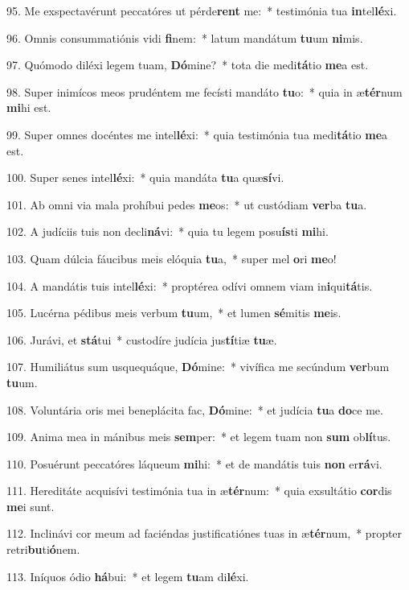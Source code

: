 95. Me exspectavérunt peccatóres ut pérde\textbf{rent} me:~*  testimónia tua \textbf{in}tel\textbf{lé}xi.\

96. Omnis consummatiónis vidi \textbf{fi}nem:~*  latum mandátum \textbf{tu}um \textbf{ni}mis.\

97. Quómodo diléxi legem tuam, \textbf{Dó}mine?~*  tota die medi\textbf{tá}tio \textbf{me}a est.\

98. Super inimícos meos prudéntem me fecísti mandáto \textbf{tu}o:~*  quia in æ\textbf{tér}num \textbf{mi}hi est.\

99. Super omnes docéntes me intel\textbf{lé}xi:~*  quia testimónia tua medi\textbf{tá}tio \textbf{me}a est.\

100. Super senes intel\textbf{lé}xi:~*  quia mandáta \textbf{tu}a quæ\textbf{sí}vi.\

101. Ab omni via mala prohíbui pedes \textbf{me}os:~*  ut custódiam \textbf{ver}ba \textbf{tu}a.\

102. A judíciis tuis non decli\textbf{ná}vi:~*  quia tu legem posu\textbf{ís}ti \textbf{mi}hi.\

103. Quam dúlcia fáucibus meis elóquia \textbf{tu}a,~*  super mel \textbf{o}ri \textbf{me}o!\

104. A mandátis tuis intel\textbf{lé}xi:~*  proptérea odívi omnem viam in\textbf{i}qui\textbf{tá}tis.\

105. Lucérna pédibus meis verbum \textbf{tu}um,~*  et lumen \textbf{sé}mitis \textbf{me}is.\

106. Jurávi, et \textbf{stá}tui~*  custodíre judícia jus\textbf{tí}tiæ \textbf{tu}æ.\

107. Humiliátus sum usquequáque, \textbf{Dó}mine:~*  vivífica me secúndum \textbf{ver}bum \textbf{tu}um.\

108. Voluntária oris mei beneplácita fac, \textbf{Dó}mine:~*  et judícia \textbf{tu}a \textbf{do}ce me.\

109. Anima mea in mánibus meis \textbf{sem}per:~*  et legem tuam non \textbf{sum} ob\textbf{lí}tus.\

110. Posuérunt peccatóres láqueum \textbf{mi}hi:~*  et de mandátis tuis \textbf{non} er\textbf{rá}vi.\

111. Hereditáte acquisívi testimónia tua in æ\textbf{tér}num:~*  quia exsultátio \textbf{cor}dis \textbf{me}i sunt.\

112. Inclinávi cor meum ad faciéndas justificatiónes tuas in æ\textbf{tér}num,~*  propter retri\textbf{bu}ti\textbf{ó}nem.\

113. Iníquos ódio \textbf{há}bui:~*  et legem \textbf{tu}am di\textbf{lé}xi.\

